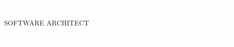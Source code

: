 \documentclass[10pt,letterpaper]{article}
\begin{document}
\noindent\colorbox{headerBg}{%
\begin{minipage}[t][2.2in][t]{\paperwidth}
\vspace{0.4in}
\hspace{0.5in}
\begin{minipage}{7in}

{\displayfont\fontsize{32}{36}\selectfont\textcolor{white}{\textbf{CHRISTIAN OKADA}}}

\vspace{8pt}

{\large\textcolor{accentCyan}{SOFTWARE ARCHITECT}}

\vspace{16pt}

{\small\textcolor{white}{
571.527.9694 \hspace{15pt}
christian.okada@gmail.com \hspace{15pt}
@OkadaChristian \hspace{15pt}
San Diego, CA
}}

\end{minipage}
\end{minipage}%
}
\end{document}
